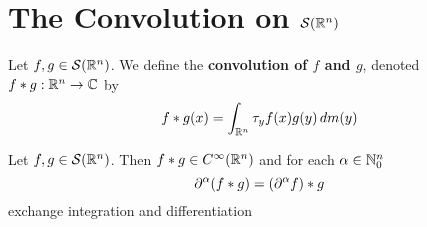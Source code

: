 \documentclass{book}
\begin{document}
\newpage
\section{The Convolution on $\mathcal{S}(\mathbb{R}^n)$}

	\begin{defn}
		Let $f, g \in \mathcal{S}(\mathbb{R}^n)$. We define the \textbf{convolution of $f$ and $g$}, denoted $f * g: \mathbb{R}^n \rightarrow \mathbb{C}$ by $$f*g(x) = \int_{\mathbb{R}^n} \tau_yf(x) g(y) \, d m(y)$$
	\end{defn}

	\begin{ex}
		Let $f,g \in \mathcal{S}(\mathbb{R}^n)$. Then $f*g \in C^{\infty}(\mathbb{R}^n)$ and for each $\alpha \in \mathbb{N}_0^n$
		$$\partial^{\alpha}(f*g) = (\partial^{\alpha}f)*g$$ 
		 exchange integration and differentiation
	\end{ex}
\end{document}
